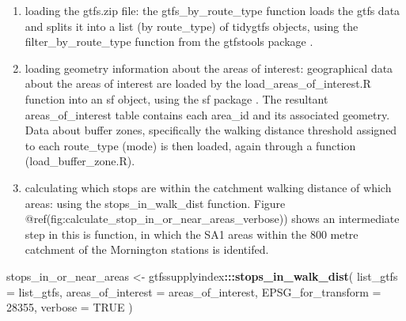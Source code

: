 \documentclass[preprint, 3p,
authoryear]{elsarticle} %
\newenvironment{Shaded}{\begin{snugshade}}{\end{snugshade}}
\newcommand{\AttributeTok}[1]{\textcolor[rgb]{0.13,0.29,0.53}{#1}}
\newcommand{\ConstantTok}[1]{\textcolor[rgb]{0.56,0.35,0.01}{#1}}
\newcommand{\DecValTok}[1]{\textcolor[rgb]{0.00,0.00,0.81}{#1}}
\newcommand{\FunctionTok}[1]{\textcolor[rgb]{0.13,0.29,0.53}{\textbf{#1}}}
\newcommand{\NormalTok}[1]{#1}
\newcommand{\OtherTok}[1]{\textcolor[rgb]{0.56,0.35,0.01}{#1}}
\newcommand{\SpecialCharTok}[1]{\textcolor[rgb]{0.81,0.36,0.00}{\textbf{#1}}}
\begin{document}
\begin{enumerate}
\def\labelenumi{(\arabic{enumi})}
\item
  loading the gtfs.zip file: the gtfs\_by\_route\_type function loads
  the gtfs data and splits it into a list (by route\_type) of tidygtfs
  objects, using the filter\_by\_route\_type function from the gtfstools
  package \citep{filter_GTFS_by_mode}.
\item
  loading geometry information about the areas of interest: geographical
  data about the areas of interest are loaded by the
  load\_areas\_of\_interest.R function into an sf object, using the sf
  package \citep{R-sf}. The resultant areas\_of\_interest table contains
  each area\_id and its associated geometry. Data about buffer zones,
  specifically the walking distance threshold assigned to each
  route\_type (mode) is then loaded, again through a function
  (load\_buffer\_zone.R).
\item
  calculating which stops are within the catchment walking distance of
  which areas: using the stops\_in\_walk\_dist function. Figure
  @ref(fig:calculate\_stop\_in\_or\_near\_areas\_verbose)) shows an
  intermediate step in this is function, in which the SA1 areas within
  the 800 metre catchment of the Mornington stations is identifed.
\end{enumerate}

\begin{Shaded}
\begin{Highlighting}[]
\NormalTok{stops\_in\_or\_near\_areas }\OtherTok{\textless{}{-}}\NormalTok{ gtfssupplyindex}\SpecialCharTok{:::}\FunctionTok{stops\_in\_walk\_dist}\NormalTok{(}
  \AttributeTok{list\_gtfs =}\NormalTok{ list\_gtfs, }
  \AttributeTok{areas\_of\_interest =}\NormalTok{ areas\_of\_interest,}
  \AttributeTok{EPSG\_for\_transform =} \DecValTok{28355}\NormalTok{, }
  \AttributeTok{verbose =} \ConstantTok{TRUE}
\NormalTok{)}
\end{Highlighting}
\end{Shaded}
\end{document}
